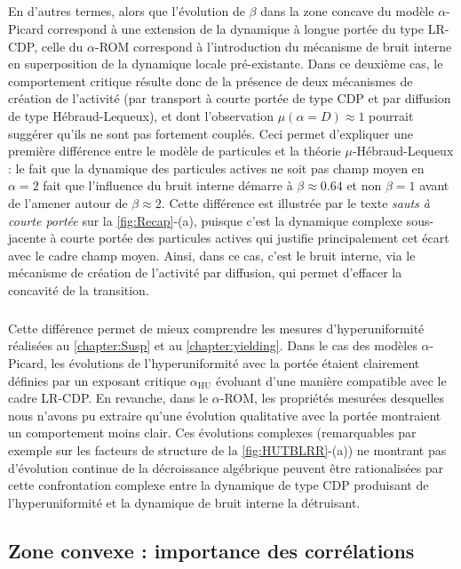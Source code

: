 \subparagraph{}En d'autres termes, alors que l'évolution de $\beta$ dans la zone concave du modèle $\alpha$-Picard correspond à une extension de la dynamique à longue portée du type LR-CDP, celle du $\alpha$-ROM correspond à l'introduction du mécanisme de bruit interne en superposition de la dynamique locale pré-existante. Dans ce deuxième cas, le comportement critique résulte donc de la présence de deux mécanismes de création de l'activité (par transport à courte portée de type CDP et par diffusion de type Hébraud-Lequeux), et dont l'observation $\mu(\alpha = D) \approx 1$ pourrait suggérer qu'ils ne sont pas fortement couplés. Ceci permet d'expliquer une première différence entre le modèle de particules et la théorie $\mu$-Hébraud-Lequeux : le fait que la dynamique des particules actives ne soit pas champ moyen en $\alpha = 2$ fait que l'influence du bruit interne démarre à $\beta \approx 0.64$ et non $\beta = 1$ avant de l'amener autour de $\beta \approx 2$. Cette différence est illustrée par le texte \textit{sauts à courte portée} sur la \autoref{fig:Recap}-(a), puisque c'est la dynamique complexe sous-jacente à courte portée des particules actives qui justifie principalement cet écart avec le cadre champ moyen. Ainsi, dans ce cas, c'est le bruit interne, via le mécanisme de création de l'activité par diffusion, qui permet d'effacer la concavité de la transition.

\subparagraph{}Cette différence permet de mieux comprendre les mesures d'hyperuniformité réalisées au \autoref{chapter:Susp} et au \autoref{chapter:yielding}. Dans le cas des modèles $\alpha$-Picard, les évolutions de l'hyperuniformité avec la portée étaient clairement définies par un exposant critique $\alpha_\text{HU}$ évoluant d'une manière compatible avec le cadre LR-CDP. En revanche, dans le $\alpha$-ROM, les propriétés mesurées desquelles nous n'avons pu extraire qu'une évolution qualitative avec la portée montraient un comportement moins clair. Ces évolutions complexes (remarquables par exemple sur les facteurs de structure de la \autoref{fig:HUTBLRR}-(a)) ne montrant pas d'évolution continue de la décroissance algébrique peuvent être rationalisées par cette confrontation complexe entre la dynamique de type CDP produisant de l'hyperuniformité et la dynamique de bruit interne la détruisant.

\FloatBarrier

\subsection{Zone convexe : importance des corrélations}

